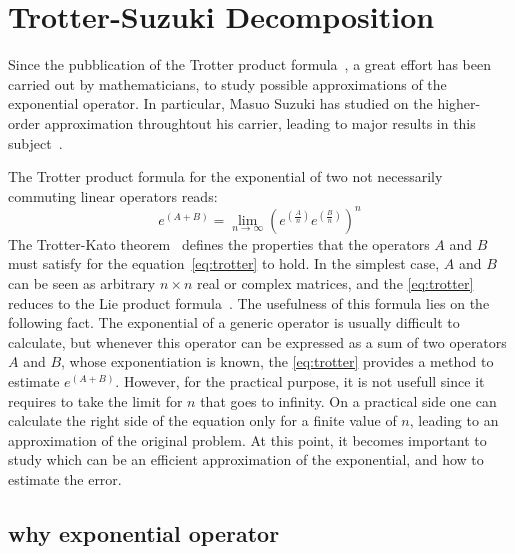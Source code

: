\chapter{Trotter-Suzuki Decomposition}

Since the pubblication of the Trotter product formula~\cite{Trotter1959}, a great effort has been carried out by mathematicians, to study possible approximations of the exponential operator. In particular, Masuo Suzuki has studied on the higher-order approximation throughtout his carrier, leading to major results in this subject~\cite{Suzuki1985, Suzuki2000}.

The Trotter product formula for the exponential of two not necessarily commuting linear operators reads:
\begin{equation} \label{eq:trotter}
e^{(A+B)} = \lim_{n\rightarrow\infty} (e^{(\frac{A}{n})} e^{(\frac{B}{n})})^n
\end{equation}
The Trotter-Kato theorem~\cite{TrotterKatoTheorem} defines the properties that the operators $A$ and $B$ must satisfy for the equation~\eqref{eq:trotter} to hold. In the simplest case, $A$ and $B$ can be seen as arbitrary $n\times n$ real or complex matrices, and the \eqref{eq:trotter} reduces to the Lie product formula~\cite{LieSophus}. The usefulness of this formula lies on the following fact. The exponential of a generic operator is usually difficult to calculate, but whenever this operator can be expressed as a sum of two operators $A$ and $B$, whose exponentiation is known, the \eqref{eq:trotter} provides a method to estimate $e^{(A+B)}$. However, for the practical purpose, it is not usefull since it requires to take the limit for $n$ that goes to infinity. On a practical side one can calculate the right side of the equation only for a finite value of $n$, leading to an approximation of the original problem. At this point, it becomes important to study which can be an efficient approximation of the exponential, and how to estimate the error.

\section{why exponential operator}

